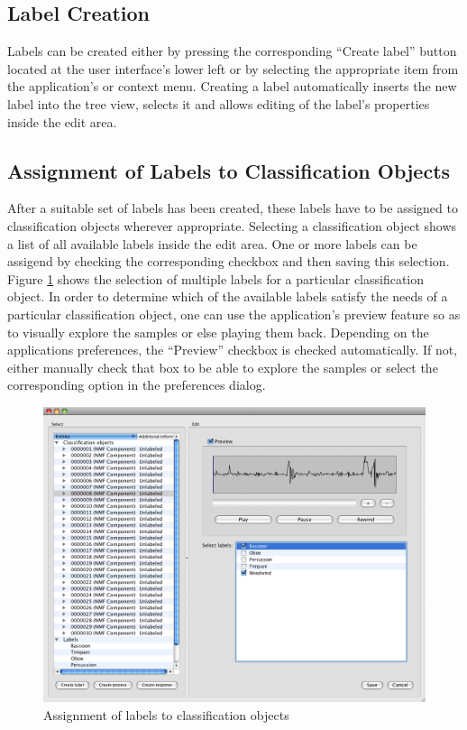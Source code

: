 \subsection{Label Creation}

Labels can be created either by pressing the corresponding ``Create label''
button located at the user interface's lower left or by selecting the
appropriate item from the application's or context menu. Creating a label
automatically inserts the new label into the tree view, selects it and allows
editing of the label's properties inside the edit area.


\subsection{Assignment of Labels to Classification Objects}

After a suitable set of labels has been created, these labels have to be
assigned to classification objects wherever appropriate. Selecting a
classification object shows a list of all available labels inside the edit
area. One or more labels can be assigend by checking the corresponding checkbox
and then saving this selection. Figure \ref{figure:LabelAssignment} shows the
selection of multiple labels for a particular classification object.  In order
to determine which of the available labels satisfy the needs of a particular
classification object, one can use the application's preview feature so as to
visually explore the samples or else playing them back. Depending on the
applications preferences, the ``Preview'' checkbox is checked automatically. If
not, either manually check that box to be able to explore the samples or select
the corresponding option in the preferences dialog.

\begin{figure}
    \includegraphics[width=\textwidth]{images/LabelAssignment.png}
    \caption{%
        \label{figure:LabelAssignment}%
        Assignment of labels to classification objects
    }
\end{figure}

